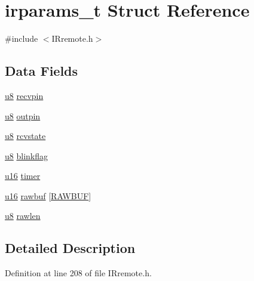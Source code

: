 \hypertarget{structirparams__t}{\section{irparams\-\_\-t Struct Reference}
\label{structirparams__t}
}


{\ttfamily \#include $<$I\-Rremote.\-h$>$}

\subsection*{Data Fields}
\begin{DoxyCompactItemize}
\item 
\hyperlink{p8_2pinguino_2core_2typedef_8h_aed742c436da53c1080638ce6ef7d13de}{u8} \hyperlink{structirparams__t_a4831b4b2b741b9a1c9e40a3cb4384b4b}{recvpin}
\item 
\hyperlink{p8_2pinguino_2core_2typedef_8h_aed742c436da53c1080638ce6ef7d13de}{u8} \hyperlink{structirparams__t_ac90c4f59fb73d64a42331fcb09778461}{outpin}
\item 
\hyperlink{p8_2pinguino_2core_2typedef_8h_aed742c436da53c1080638ce6ef7d13de}{u8} \hyperlink{structirparams__t_ad19b6aa0f045f1d4ae8e8d91427b43fb}{rcvstate}
\item 
\hyperlink{p8_2pinguino_2core_2typedef_8h_aed742c436da53c1080638ce6ef7d13de}{u8} \hyperlink{structirparams__t_a1bf5117b95b2ced3fbba930ad2b41aa7}{blinkflag}
\item 
\hyperlink{p8_2pinguino_2core_2typedef_8h_a50b0d1c7a54fa09a64a3ac111c778520}{u16} \hyperlink{structirparams__t_a4dd98e3cba82c3c6cfa930335b55a567}{timer}
\item 
\hyperlink{p8_2pinguino_2core_2typedef_8h_a50b0d1c7a54fa09a64a3ac111c778520}{u16} \hyperlink{structirparams__t_a94732347617676924147d2b6deab4cda}{rawbuf} \mbox{[}\hyperlink{_i_rremote_8h_abb919079668bcc14433d4c857ab8a196}{R\-A\-W\-B\-U\-F}\mbox{]}
\item 
\hyperlink{p8_2pinguino_2core_2typedef_8h_aed742c436da53c1080638ce6ef7d13de}{u8} \hyperlink{structirparams__t_a709f7aaae8e4e2aa1e5d5d261137eb70}{rawlen}
\end{DoxyCompactItemize}


\subsection{Detailed Description}


Definition at line 208 of file I\-Rremote.\-h.



